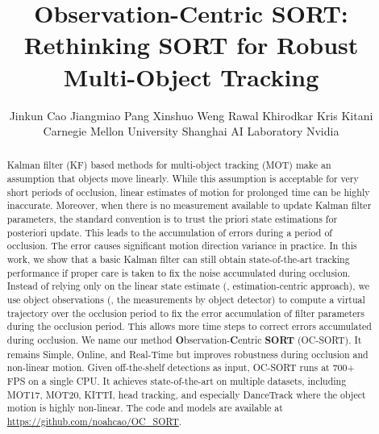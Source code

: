 \documentclass[10pt,twocolumn,letterpaper]{article}
\begin{document}
\title{Observation-Centric SORT:\\Rethinking SORT for Robust Multi-Object Tracking}





\author{Jinkun Cao \quad Jiangmiao Pang \quad Xinshuo Weng \quad Rawal Khirodkar \quad Kris Kitani \\
 Carnegie Mellon University \quad \quad  Shanghai AI Laboratory \quad \quad Nvidia
}
\maketitle

\begin{abstract}
Kalman filter (KF) based methods for multi-object tracking (MOT) make an assumption that objects move linearly. While this assumption is acceptable for very short periods of occlusion, linear estimates of motion for prolonged time can be highly inaccurate. Moreover, when there is no measurement available to update Kalman filter parameters, the standard convention is to trust the priori state estimations for posteriori update. This leads to the accumulation of errors during a period of occlusion. The error causes significant motion direction variance in practice. In this work, we show that a basic Kalman filter can still obtain state-of-the-art tracking performance if proper care is taken to fix the noise accumulated during occlusion. Instead of relying only on the linear state estimate (\ie, estimation-centric approach), we use object observations (\ie, the measurements by object detector) to compute a virtual trajectory over the occlusion period to fix the error accumulation of filter parameters during the occlusion period. This allows more time steps to correct errors accumulated during occlusion. We name our method \textbf{O}bservation-\textbf{C}entric \textbf{SORT} (OC-SORT). It remains Simple, Online, and Real-Time but improves robustness during occlusion and non-linear motion. Given off-the-shelf detections as input, OC-SORT runs at 700+ FPS on a single CPU. It achieves state-of-the-art on multiple datasets, including MOT17, MOT20, KITTI, head tracking, and especially DanceTrack where the object motion is highly non-linear. The code and models are available at \url{https://github.com/noahcao/OC_SORT}.
\end{abstract}
\end{document}
